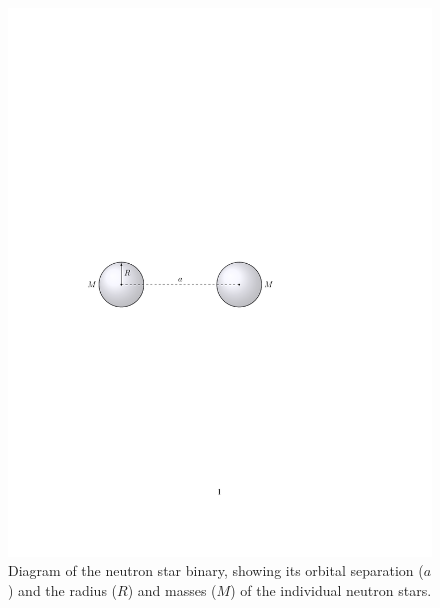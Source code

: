 \documentclass[11pt]{article}
\begin{document}
\begin{figure}
\centering
\includegraphics{binary_diagram.pdf}
\caption{\label{fig:binary_diagram}Diagram of the neutron star binary, showing its orbital separation ($a$) and the radius ($R$) and masses ($M$) of the individual neutron stars.}
\end{figure}
\end{document}
